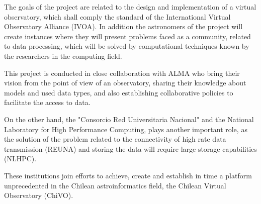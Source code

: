 The goals of the project are related to the design and implementation of a
virtual observatory, which shall comply the standard of the International
Virtual Observatory Alliance (IVOA). In addition the astronomers of the
project will create instances where they will present problems faced as a community,
related to data processing, which will be solved by computational techniques
known by the researchers in the computing field.

This project is conducted in close collaboration with ALMA who bring their
vision from the point of view of an observatory, sharing their knowledge about models and
used data types, and also establishing collaborative policies to
facilitate the access to data.

On the other hand, the "Consorcio Red Universitaria Nacional" and the National
Laboratory for High Performance Computing, plays another important role, as the solution
of the problem related to the connectivity of high rate data transmission
(REUNA) and storing the data will require large storage capabilities (NLHPC).

These institutions join efforts to achieve, create and establish in
time a platform unprecedented in the Chilean astroinformatics field, the Chilean
Virtual Observatory (ChiVO).
